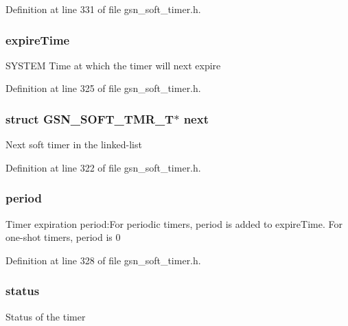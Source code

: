 Definition at line 331 of file gsn\_\-soft\_\-timer.h.

\hypertarget{a00229_ad9a0a5a2ce626900fa5f3da2650594e3}{
\subsubsection[{expireTime}]{ {\bf expireTime}}}
\label{a00229_ad9a0a5a2ce626900fa5f3da2650594e3}
SYSTEM Time at which the timer will next expire 

Definition at line 325 of file gsn\_\-soft\_\-timer.h.

\hypertarget{a00229_a200ef44ce9f15e4c6203125811b9e5de}{
\subsubsection[{next}]{\setlength{\rightskip}{0pt plus 5cm}struct {\bf GSN\_\-SOFT\_\-TMR\_\-T}$\ast$ {\bf next}}}
\label{a00229_a200ef44ce9f15e4c6203125811b9e5de}
Next soft timer in the linked-\/list 

Definition at line 322 of file gsn\_\-soft\_\-timer.h.

\hypertarget{a00229_a3b84f6ec4bf7d6dca6c041f42394e437}{
\subsubsection[{period}]{ {\bf period}}}
\label{a00229_a3b84f6ec4bf7d6dca6c041f42394e437}
Timer expiration period:For periodic timers, period is added to expireTime. For one-\/shot timers, period is 0 

Definition at line 328 of file gsn\_\-soft\_\-timer.h.

\hypertarget{a00229_ac4f6d5d1544a8d2c1309479ffe1b61ab}{
\subsubsection[{status}]{ {\bf status}}}
\label{a00229_ac4f6d5d1544a8d2c1309479ffe1b61ab}
Status of the timer 

